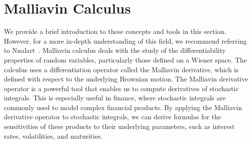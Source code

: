 \section{Malliavin Calculus}\label{apx:malliavin_calculus}
We provide a brief introduction to these concepts and tools in this section. However, for a more in-depth understanding of this field, we recommend referring to Nualart~\cite{Nualart2006TheTopics}. Malliavin calculus deals with the study of the differentiability properties of random variables, particularly those defined on a Wiener space. The calculus uses a differentiation operator called the Malliavin derivative, which is defined with respect to the underlying Brownian motion. The Malliavin derivative operator is a powerful tool that enables us to compute derivatives of stochastic integrals. This is especially useful in finance, where stochastic integrals are commonly used to model complex financial products. By applying the Malliavin derivative operator to stochastic integrals, we can derive formulas for the sensitivities of these products to their underlying parameters, such as interest rates, volatilities, and maturities.
